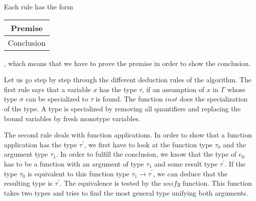 \begin{prooftree}
\end{prooftree}

\begin{prooftree}
\end{prooftree}

Each rule has the form
\begin{tabular}{c}
Premise\\
\hline
Conclusion
\end{tabular}, which means that we have to prove the premise in order to show the conclusion.

Let us go step by step through the different deduction rules of the algorithm.
The first rule says that a variable $x$ has the type $\tau$, if an assumption of $x$ in $\Gamma$ whose type $\sigma$ can be specialized to $\tau$ is found.
The function $inst$ does the specialization of the type.
A type is specialized by removing all quantifiers and replacing the bound variables by fresh monotype variables.

The second rule deals with function applications.
In order to show that a function application has the type $\tau^\prime$, we first have to look at the function type $\tau_0$ and the argument type $\tau_1$.
In order to fulfill the conclusion, we know that the type of $e_0$ has to be a function with an argument of type $\tau_1$ and some result type $\tau^\prime$.
If the type $\tau_0$ is equivalent to this function type $\tau_1\rightarrow\tau^\prime$, we can deduce that the resulting type is $\tau^\prime$.
The equivalence is tested by the $unify$ function.
This function takes two types and tries to find the most general type unifying both arguments.


